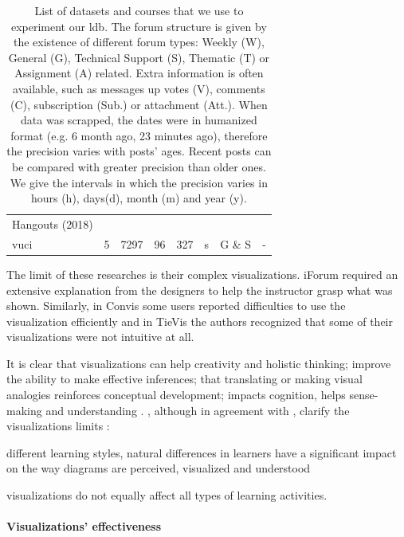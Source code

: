 \documentclass[a4paper,twoside]{article}
\begin{document}
\begin{table}[t]
\begin{tabular}{lllrrllp{}}
  Hangouts (2018) & & & \multicolumn{1}{l}{} & \multicolumn{1}{l}{} & & & \\ [.2cm]
  \gls{vuci} & \multicolumn{1}{r}{5} & \multicolumn{1}{r}{7297} & 96 & 327 & \multicolumn{1}{l}{s} & G \& S & - \\  \bottomrule
 \end{tabular}
 \caption{\label{tab:datasets}List of datasets and courses that we use to experiment our \gls{ldb}.  The forum structure is given by the existence of different forum types: Weekly (W), General (G), Technical Support (S), Thematic (T) or Assignment (A) related.  Extra information is often available, such as messages up votes (V), comments (C), subscription (Sub.) or attachment (Att.).  When data was scrapped, the dates were in humanized format (e.g.  6 month ago, 23 minutes ago), therefore the precision varies with posts' ages.  Recent posts can be compared with greater precision than older ones.  We give the intervals in which the precision varies in hours (h), days(d), month (m) and year (y).}
\end{table}


The limit of these researches is their complex visualizations.  iForum required an extensive explanation from the designers to help the instructor grasp what was shown.  Similarly, in Convis some users reported difficulties to use the visualization efficiently and in TieVis the authors recognized that some of their visualizations were not intuitive at all.

It is clear that visualizations can help creativity and holistic thinking; improve the ability to make effective inferences; that translating or making visual analogies reinforces conceptual development; impacts cognition, helps sense-making and understanding \citep{Klerkx2014}.  \cite{Twissell2014}, although in agreement with \cite{Klerkx2014}, clarify the visualizations limits : 
\begin{inparaenum}
\item different learning styles, natural differences in learners have a significant impact on the way diagrams are perceived, visualized and understood
\item visualizations do not equally affect all types of learning activities.
\end{inparaenum}


\paragraph{Visualizations' effectiveness}
\end{document}
